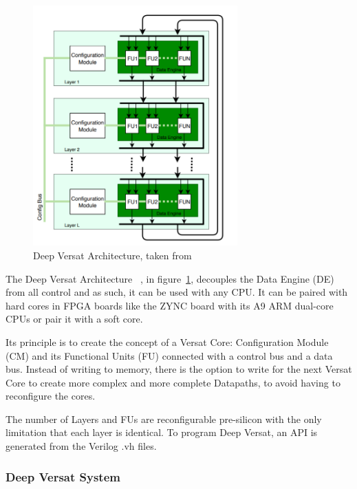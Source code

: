 \begin{figure}[!htb]
    \centering
    \includegraphics[width=0.7\textwidth]{Figures/deep-Versat.png}
    \caption{Deep Versat Architecture, taken from~\cite{valter:deepversat}}
    \label{figure:deepversatarch}
\end{figure} 

\quad The Deep Versat Architecture~\cite{valter:deepversat}
, in figure~\ref{figure:deepversatarch}, decouples the Data Engine (DE) from all control and as such, it can be used with any CPU. 
It can be paired with hard cores in
FPGA boards like the ZYNC board %
with its A9 ARM dual-core CPUs or pair it with a soft core.

Its principle is to create the concept of a Versat Core: Configuration Module (CM) and its Functional Units (FU) connected with a control bus and a data bus.
Instead of writing to memory, there is the option to write for the next
Versat Core to create more complex and more complete Datapaths, to avoid
having to reconfigure the cores.

The number of Layers and FUs are reconfigurable pre-silicon with the only limitation
that each layer is identical. To program Deep Versat, an API is generated
from the Verilog .vh files. 




\newpage
\subsubsection{Deep Versat System}

